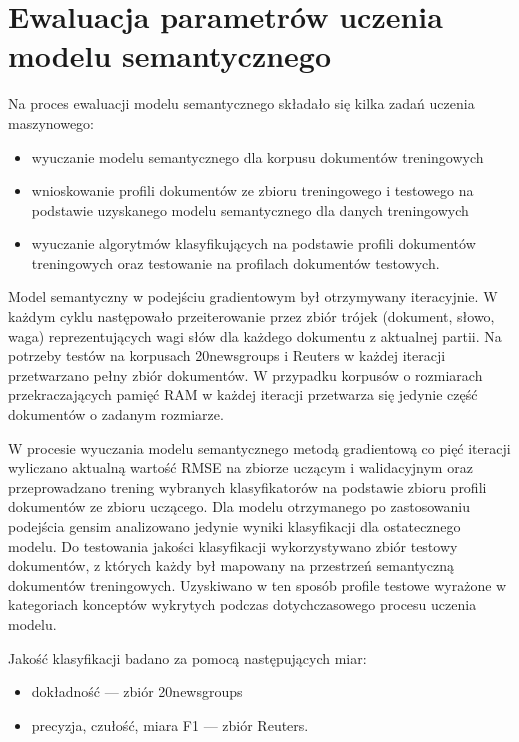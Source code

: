 \documentclass{pracamgr}
\begin{document}
\section{Ewaluacja parametrów uczenia modelu semantycznego}

Na proces ewaluacji modelu semantycznego składało się kilka zadań uczenia maszynowego:
\begin{itemize}
    \item wyuczanie modelu semantycznego dla korpusu dokumentów treningowych
    \item wnioskowanie profili dokumentów ze zbioru treningowego i testowego na podstawie uzyskanego modelu semantycznego dla danych treningowych
    \item wyuczanie algorytmów klasyfikujących na podstawie profili dokumentów treningowych oraz testowanie na profilach dokumentów testowych.
\end{itemize}

Model semantyczny w podejściu gradientowym był otrzymywany iteracyjnie. W każdym cyklu następowało przeiterowanie przez zbiór trójek (dokument, słowo, waga) reprezentujących wagi słów dla każdego dokumentu z aktualnej partii. Na potrzeby testów na korpusach 20newsgroups i Reuters w każdej iteracji przetwarzano pełny zbiór dokumentów. W przypadku korpusów o rozmiarach przekraczających pamięć RAM w każdej iteracji przetwarza się jedynie część dokumentów o zadanym rozmiarze.

W procesie wyuczania modelu semantycznego metodą gradientową co pięć iteracji wyliczano aktualną wartość RMSE na zbiorze uczącym i walidacyjnym oraz przeprowadzano trening wybranych klasyfikatorów na podstawie zbioru profili dokumentów ze zbioru uczącego. Dla modelu otrzymanego po zastosowaniu podejścia gensim analizowano jedynie wyniki klasyfikacji dla ostatecznego modelu. Do testowania jakości klasyfikacji wykorzystywano zbiór testowy dokumentów, z których każdy był mapowany na przestrzeń semantyczną dokumentów treningowych. Uzyskiwano w ten sposób profile testowe wyrażone w kategoriach konceptów wykrytych podczas dotychczasowego procesu uczenia modelu.

Jakość klasyfikacji badano za pomocą następujących miar:

\begin{itemize}
    \item dokładność --- zbiór 20newsgroups
    \item precyzja, czułość, miara F1 --- zbiór Reuters.
\end{itemize}
\end{document}
